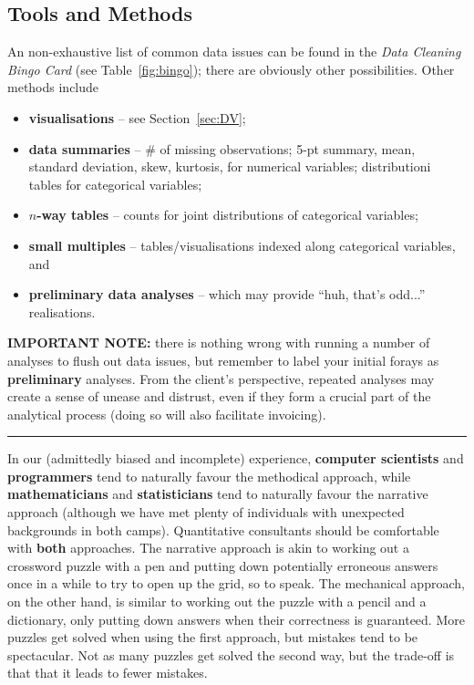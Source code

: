 \subsection{Tools and Methods} An non-exhaustive list of common data issues can be found in the \textit{Data Cleaning Bingo Card} (see Table~\ref{fig:bingo}); there are obviously other possibilities. Other methods include 
\begin{itemize}[noitemsep]
\item \textbf{visualisations} -- see Section~\ref{sec:DV};
\item \textbf{data summaries} -- \# of missing observations; 5-pt summary, mean, standard deviation, skew, kurtosis, for numerical variables; distributioni tables for categorical variables; 
\item \textbf{$n$-way tables} -- counts for joint distributions of categorical variables;
\item \textbf{small multiples} -- tables/visualisations indexed along categorical variables, and
\item \textbf{preliminary data analyses} -- which may provide ``huh, that's odd...'' realisations.   
\end{itemize}
\textbf{IMPORTANT NOTE:} there is nothing wrong with running a number of analyses to flush out data issues, but remember to label your initial forays as \textbf{preliminary} analyses. From the client's perspective, repeated analyses may create a sense of unease and distrust, even if they form a crucial part of the analytical process (doing so will also facilitate invoicing). 
\begin{center}
    \rule{0.5\textwidth}{.4pt}
\end{center}
In our (admittedly biased and incomplete) experience, \textbf{computer scientists} and \textbf{programmers} tend to naturally favour the methodical approach, while \textbf{mathematicians} and \textbf{statisticians} tend to naturally favour the narrative approach (although we have met plenty of individuals with unexpected backgrounds in both camps). Quantitative consultants should be comfortable with \textbf{both} approaches. 
\newl The narrative approach is akin to working out a crossword puzzle with a pen and putting down potentially erroneous answers once in a while to try to open up the grid, so to speak. The mechanical approach, on the other hand, is similar to working out the puzzle with a pencil and a dictionary, only putting down answers when their correctness is guaranteed. More puzzles get solved when using the first approach, but mistakes tend to be spectacular. Not as many puzzles get solved the second way, but the trade-off is that that it leads to fewer mistakes. 
